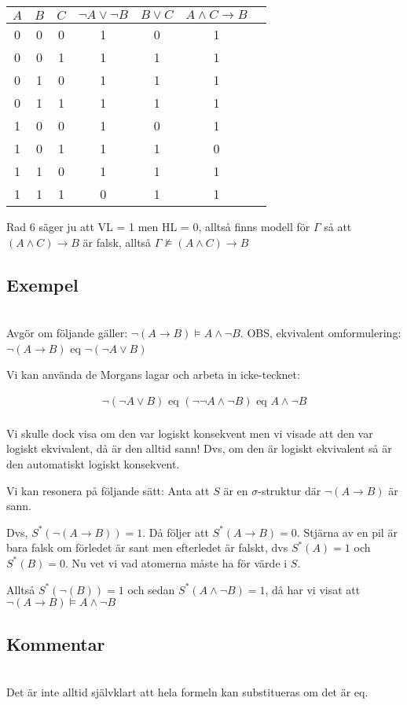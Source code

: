 \begin{center}
  \begin{tabular}{|c|c|c|c|c|c|c|}
    \hline
    $A$&$B$&$C$&$\neg A\vee\neg B$&$B\vee C$&$A\wedge C\rightarrow B$\\
    \hline
    0&0&0&1&0&1\\
    \hline
    0&0&1&1&1&1\\
    \hline
    0&1&0&1&1&1\\
    \hline
    0&1&1&1&1&1\\
    \hline
    1&0&0&1&0&1\\
    \hline
    1&0&1&1&1&0\\
    \hline
    1&1&0&1&1&1\\
    \hline
    1&1&1&0&1&1\\
    \hline
  \end{tabular}
\end{center}
\par\bigskip
\noindent Rad 6 säger ju att VL = 1 men HL = 0, alltså finns modell för $\Gamma$ så att $(A\wedge C)\rightarrow B$ är falsk, alltså $\Gamma\nvDash(A\wedge C)\rightarrow B$
\par\bigskip
\subsection{Exempel}\hfill\\
\noindent Avgör om följande gäller: $\neg(A\rightarrow B)\vDash A\wedge\neg B$. OBS, ekvivalent omformulering: $\neg(A\rightarrow B)$ eq $\neg(\neg A\vee B)$
\par\bigskip
\noindent Vi kan använda de Morgans lagar och arbeta in icke-tecknet:

\begin{equation*}
  \begin{gathered}
    \neg(\neg A\vee B) \text{ eq } (\neg\neg A\wedge\neg B)\text{ eq } A\wedge\neg B\\
  \end{gathered}
\end{equation*}
\par\bigskip
\noindent Vi skulle dock visa om den var logiskt konsekvent men vi visade att den var logiskt ekvivalent, då är den alltid sann! Dvs, om den är logiskt ekvivalent så är den automatiskt logiskt konsekvent.
\par\bigskip
\noindent Vi kan resonera på följande sätt: Anta att $S$ är en $\sigma$-struktur där $\neg(A\rightarrow B)$ är sann.\par\noindent Dvs, $S^*(\neg(A\rightarrow B)) = 1$. Då följer att $S^*(A\rightarrow B) = 0$. Stjärna av en pil är bara falsk om förledet är sant men efterledet är falskt, dvs $S^*(A) = 1$ och $S^*(B) = 0$. Nu vet vi vad atomerna måste ha för värde i $S$.\par\noindent Alltså $S^*(\neg(B))=1$ och sedan $S^*(A\wedge\neg B)=1$, då har vi visat att $\neg(A\rightarrow B)\vDash A\wedge\neg B$
\par\bigskip
\subsection{Kommentar}\hfill\\
\noindent Det är inte alltid självklart att hela formeln kan substitueras om det är eq.






